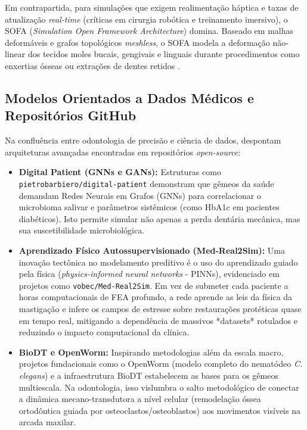 Em contrapartida, para simulações que exigem realimentação háptica e taxas de atualização \textit{real-time} (críticas em cirurgia robótica e treinamento imersivo), o SOFA (\textit{Simulation Open Framework Architecture}) domina. Baseado em malhas deformáveis e grafos topológicos \textit{meshless}, o SOFA modela a deformação não-linear dos tecidos moles bucais, gengivais e linguais durante procedimentos como enxertias ósseas ou extrações de dentes retidos \cite{xing2024clinical}.

\subsection{Modelos Orientados a Dados Médicos e Repositórios GitHub}
Na confluência entre odontologia de precisão e ciência de dados, despontam arquiteturas avançadas encontradas em repositórios \textit{open-source}:

\begin{itemize}
    \item \textbf{Digital Patient (GNNs e GANs):} Estruturas como \texttt{pietrobarbiero/digital-patient} demonstram que gêmeos da saúde demandam Redes Neurais em Grafos (GNNs) para correlacionar o microbioma salivar e parâmetros sistêmicos (como HbA1c em pacientes diabéticos). Isto permite simular não apenas a perda dentária mecânica, mas sua suscetibilidade microbiológica.
    
    \item \textbf{Aprendizado Físico Autossupervisionado (Med-Real2Sim):} Uma inovação tectônica no modelamento preditivo é o uso do aprendizado guiado pela física (\textit{physics-informed neural networks} - PINNs), evidenciado em projetos como \texttt{vobec/Med-Real2Sim}. Em vez de submeter cada paciente a horas computacionais de FEA profundo, a rede aprende as leis da física da mastigação e infere os campos de estresse sobre restaurações protéticas quase em tempo real, mitigando a dependência de massivos *datasets* rotulados e reduzindo o impacto computacional da clínica.
    
    \item \textbf{BioDT e OpenWorm:} Inspirando metodologias além da escala macro, projetos fundacionais como o OpenWorm (modelo completo do nematódeo \textit{C. elegans}) e a infraestrutura BioDT estabelecem as bases para os gêmeos multiescala. Na odontologia, isso vislumbra o salto metodológico de conectar a dinâmica mecano-transdutora a nível celular (remodelação óssea ortodôntica guiada por osteoclastos/osteoblastos) aos movimentos visíveis na arcada maxilar.
\end{itemize}
